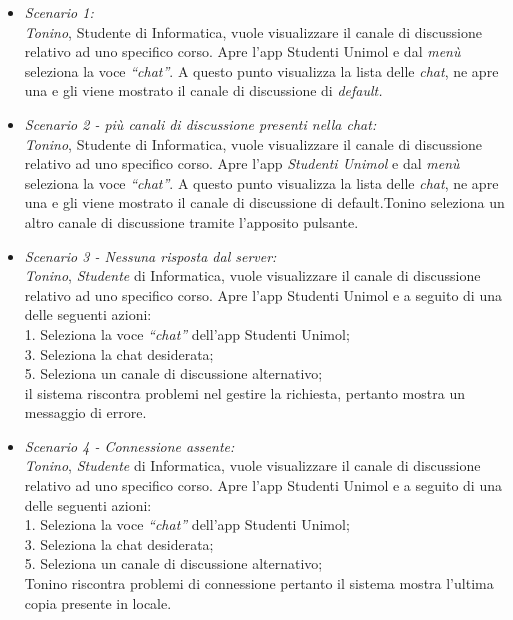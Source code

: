 \begin{itemize}

\item \textit{Scenario 1:\\}
\textit{Tonino}, Studente di Informatica, vuole visualizzare il canale di discussione relativo ad uno specifico corso. Apre l’app Studenti Unimol e dal \textit{menù} seleziona la voce \textit{“chat”}. A questo punto visualizza la lista delle \textit{chat}, ne apre una e gli viene mostrato il canale di discussione di \textit{default.\\}

\item \textit{Scenario 2 - più canali di discussione presenti nella chat:\\}
\textit{Tonino}, Studente di Informatica, vuole visualizzare il canale di discussione relativo ad uno specifico corso. Apre l’app \textit{Studenti Unimol} e dal \textit{menù} seleziona la voce \textit{“chat”}. A questo punto visualizza la lista delle \textit{chat}, ne apre una e gli viene mostrato il canale di discussione di default.Tonino seleziona un altro canale di discussione tramite l’apposito pulsante.\\

\item \textit{Scenario 3 - Nessuna risposta dal server:\\}
\textit{Tonino}, \textit{Studente} di Informatica, vuole visualizzare il canale di discussione relativo ad uno specifico corso. Apre l’app Studenti Unimol e a seguito di una delle seguenti azioni:\\
1. Seleziona la voce \textit{“chat”} dell’app Studenti Unimol;\\
3. Seleziona la chat desiderata;\\
5. Seleziona un canale di discussione alternativo;\\
il sistema riscontra problemi nel gestire la richiesta, pertanto mostra un messaggio di errore.\\

\item \textit{Scenario 4 - Connessione assente:\\}
\textit{Tonino}, \textit{Studente} di Informatica, vuole visualizzare il canale di discussione relativo ad uno specifico corso. Apre l’app Studenti Unimol e a seguito di una delle seguenti azioni:\\
1. Seleziona la  voce \textit{“chat”} dell’app Studenti Unimol;\\
3. Seleziona la chat desiderata;\\
5. Seleziona un canale di discussione alternativo;\\
Tonino riscontra problemi di connessione pertanto il sistema mostra l’ultima copia presente in locale.\\


\end{itemize}
